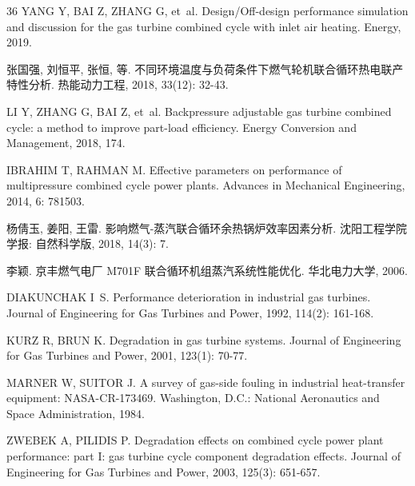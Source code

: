 \begin{thebibliography}{36}
YANG Y, BAI Z, ZHANG G, et~al.
\newblock Design/Off-design performance simulation and discussion for the gas
  turbine combined cycle with inlet air heating\allowbreak[J].
\newblock Energy, 2019.

张国强, 刘恒平, 张恒, 等.
\newblock
  不同环境温度与负荷条件下燃气轮机联合循环热电联产特性分析\allowbreak[J].
\newblock 热能动力工程, 2018, 33\allowbreak (12): 32-43.

LI Y, ZHANG G, BAI Z, et~al.
\newblock Backpressure adjustable gas turbine combined cycle: a method to
  improve part-load efficiency\allowbreak[J].
\newblock Energy Conversion and Management, 2018, 174.

IBRAHIM T, RAHMAN M.
\newblock Effective parameters on performance of multipressure combined cycle
  power plants\allowbreak[J].
\newblock Advances in Mechanical Engineering, 2014, 6: 781503.

杨倩玉, 姜阳, 王雷.
\newblock
  影响燃气-蒸汽联合循环余热锅炉效率因素分析\allowbreak[J].
\newblock 沈阳工程学院学报: 自然科学版, 2018, 14\allowbreak (3):
  7.

李颖.
\newblock 京丰燃气电厂 M701F
  联合循环机组蒸汽系统性能优化\allowbreak[D].
\newblock 华北电力大学, 2006.

DIAKUNCHAK I~S.
\newblock Performance deterioration in industrial gas turbines\allowbreak[J].
\newblock Journal of Engineering for Gas Turbines and Power, 1992,
  114\allowbreak (2): 161-168.

KURZ R, BRUN K.
\newblock Degradation in gas turbine systems\allowbreak[J].
\newblock Journal of Engineering for Gas Turbines and Power, 2001,
  123\allowbreak (1): 70-77.

MARNER W, SUITOR J.
\newblock A survey of gas-side fouling in industrial heat-transfer equipment:
  NASA-CR-173469\allowbreak[R].
\newblock Washington, D.C.: National Aeronautics and Space Administration,
  1984.

ZWEBEK A, PILIDIS P.
\newblock Degradation effects on combined cycle power plant performance: part
  I: gas turbine cycle component degradation effects\allowbreak[J].
\newblock Journal of Engineering for Gas Turbines and Power, 2003,
  125\allowbreak (3): 651-657.


\end{thebibliography}
